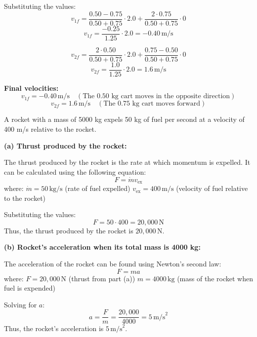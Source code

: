 \documentclass[addpoints]{exam}
\begin{document}
\begin{questions}
\begin{questions}
\begin{solution}[6cm]
Substituting the values:  
\[
v_{1f} = \frac{0.50 - 0.75}{0.50 + 0.75} \cdot 2.0 + \frac{2 \cdot 0.75}{0.50 + 0.75} \cdot 0
\]  
\[
v_{1f} = \frac{-0.25}{1.25} \cdot 2.0 = -0.40 \, \text{m/s}
\]  

\[
v_{2f} = \frac{2 \cdot 0.50}{0.50 + 0.75} \cdot 2.0 + \frac{0.75 - 0.50}{0.50 + 0.75} \cdot 0
\]  
\[
v_{2f} = \frac{1.0}{1.25} \cdot 2.0 = 1.6 \, \text{m/s}
\]  

\textbf{Final velocities:}  
\[
v_{1f} = -0.40 \, \text{m/s} \quad (\text{The 0.50 kg cart moves in the opposite direction})
\]  
\[
v_{2f} = 1.6 \, \text{m/s} \quad (\text{The 0.75 kg cart moves forward})
\]  
\end{solution}


\question A rocket with a mass of 5000 kg expels 50 kg of fuel per second at a velocity of 400 m/s relative to the rocket.
\begin{solution}[6cm]
\textbf{(a) Thrust produced by the rocket:}  

The thrust produced by the rocket is the rate at which momentum is expelled. It can be calculated using the following equation:  
\[
F = \dot{m} v_{\text{ex}} 
\]
where:  
\(\dot{m} = 50 \, \text{kg/s}\) (rate of fuel expelled)  
\(v_{\text{ex}} = 400 \, \text{m/s}\) (velocity of fuel relative to the rocket)  

Substituting the values:  
\[
F = 50 \cdot 400 = 20,000 \, \text{N}
\]  
Thus, the thrust produced by the rocket is \( 20,000 \, \text{N} \).

\textbf{(b) Rocket’s acceleration when its total mass is 4000 kg:}  

The acceleration of the rocket can be found using Newton's second law:  
\[
F = m a 
\]
where:  
\( F = 20,000 \, \text{N} \) (thrust from part (a))  
\( m = 4000 \, \text{kg} \) (mass of the rocket when fuel is expended)  

Solving for \( a \):  
\[
a = \frac{F}{m} = \frac{20,000}{4000} = 5 \, \text{m/s}^2
\]  
Thus, the rocket’s acceleration is \( 5 \, \text{m/s}^2 \).
\end{solution}




\end{questions}
\end{questions}
\end{document}
